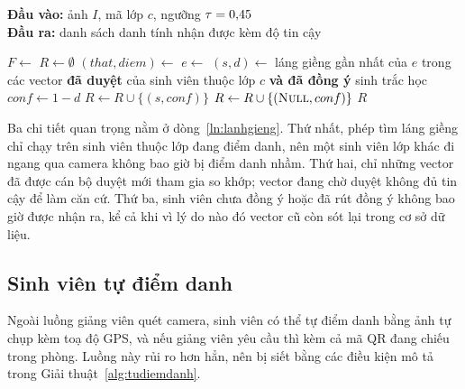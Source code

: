 \begin{algorithm}[H]
\caption{Nhận diện điểm danh từ một khung hình của lớp}
\label{alg:nhandien}
\hspace*{\algorithmicindent}\textbf{Đầu vào:} ảnh $I$, mã lớp $c$, ngưỡng $\tau = 0{,}45$\\
\hspace*{\algorithmicindent}\textbf{Đầu ra:} danh sách danh tính nhận được kèm độ tin cậy
\begin{algorithmic}[1]
  \State $F \gets$ 
  \State $R \gets \emptyset$
    \State $(that, diem) \gets$ 
    \State $e \gets$ 
    \State $(s, d) \gets$ láng giềng gần nhất của $e$ trong các vector
           \textbf{đã duyệt} của sinh viên thuộc lớp $c$ \textbf{và đã đồng
           ý} sinh trắc học \label{ln:lanhgieng}
    \State $conf \gets 1 - d$
      \State $R \gets R \cup \{(s, conf)\}$
    \Else
      \State $R \gets R \cup \{(\textsc{Null}, conf)\}$
    \EndIf
  \EndFor
  \State \Return $R$
\EndFunction
\end{algorithmic}
\end{algorithm}

Ba chi tiết quan trọng nằm ở dòng~\ref{ln:lanhgieng}. Thứ nhất, phép tìm
láng giềng chỉ chạy trên sinh viên thuộc lớp đang điểm danh, nên một sinh viên
lớp khác đi ngang qua camera không bao giờ bị điểm danh nhầm. Thứ hai, chỉ
những vector đã được cán bộ duyệt mới tham gia so khớp; vector đang chờ duyệt
không đủ tin cậy để làm căn cứ. Thứ ba, sinh viên chưa đồng ý hoặc đã rút đồng
ý không bao giờ được nhận ra, kể cả khi vì lý do nào đó vector cũ còn sót lại
trong cơ sở dữ liệu.

\subsection{Sinh viên tự điểm danh}

Ngoài luồng giảng viên quét camera, sinh viên có thể tự điểm danh bằng ảnh tự
chụp kèm toạ độ GPS, và nếu giảng viên yêu cầu thì kèm cả mã QR đang chiếu
trong phòng. Luồng này rủi ro hơn hẳn, nên bị siết bằng các điều kiện mô tả
trong Giải thuật~\ref{alg:tudiemdanh}.

